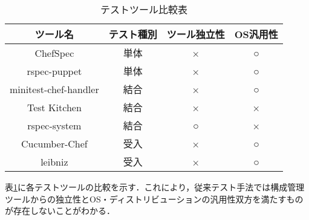 \begin{table}[htb]
  \begin{center}
    \caption{テストツール比較表\label{tab:comparison}}
    \begin{tabular}{|c|c|c|c|}
      \hline
      ツール名 & テスト種別 & ツール独立性 & OS汎用性 \\
      \hline
      \hline
      ChefSpec              & 単体 & ×  & ○ \\
      \hline
      rspec-puppet          & 単体 & ×  & ○ \\
      \hline
      minitest-chef-handler & 結合 & ×  & ○ \\
      \hline
      Test Kitchen          & 結合 & ×  & × \\
      \hline
      rspec-system          & 結合 & ○ & × \\
      \hline
      Cucumber-Chef         & 受入 & ×  & ○ \\
      \hline
      leibniz               & 受入 & ×  & ○ \\
      \hline
    \end{tabular}
  \end{center}
\end{table}

表\ref{tab:comparison}に各テストツールの比較を示す．これにより，従来テスト手法では構成管理ツールからの独立性とOS・ディストリビューションの汎用性双方を満たすものが存在しないことがわかる．
